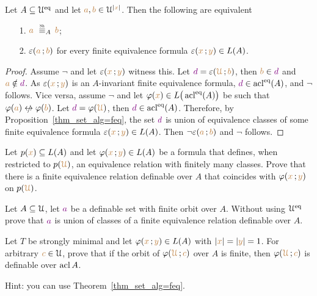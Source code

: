 \documentclass[creche.tex]{subfiles}
\begin{document}
\begin{proposition}
Let $A\subseteq\EuScript U^{{\rm eq}}$ and let ${\color{brown} a},{\color{brown} b}\in\EuScript U^{|{\color{brown} x}|}$. Then the following are equivalent
\begin{itemize}
\item[1.]  ${\mr a}\ \equivSh_A\, {\mr b}$;
\item[2.]  $\varepsilon({\color{brown} a}\,;{\color{brown} b})$ for every finite equivalence formula $\varepsilon({\color{brown} x}\,;{\color{brown} y})\in L(A)$.
\end{itemize} 
\end{proposition}
\begin{proof}
Assume $\neg$ and let $\varepsilon({\color{brown} x}\,;{\color{brown} y})$ witness this. Let ${\color{violet} d}=\varepsilon({\color{brown}\EuScript U}\,;{\color{brown} b})$, then  ${\color{brown} b}\in{\color{violet}d}$ and ${\color{brown} a}\notin{\color{violet}d}$. As $\varepsilon({\color{brown} x}\,;{\color{brown} y})$ is an $A$-invariant finite equivalence formula, ${\color{violet} d}\in\mathop{\rm acl}^{{\rm eq}}(A)$, and $\neg$ follows. Vice versa, assume $\neg$ and let $\varphi({\color{brown} x})\in L\big(\mathop{\rm acl}^{{\rm eq}}(A)\big)$ be  such that $\phi({\mr a})\niff\phi({\mr b})$. Let ${\color{violet} d}=\varphi({\color{brown}\EuScript U})$, then ${\color{violet} d}\in\mathop{\rm acl}^{{\rm eq}}(A)$. Therefore, by Proposition~\ref{thm_set_alg=feq}, the set ${\color{violet} d}$ is union of equivalence classes of some finite equivalence formula $\varepsilon({\color{brown} x}\,;{\color{brown} y})\in L(A)$. Then $\neg\varepsilon({\color{brown} a}\,;{\color{brown} b})$ and $\neg$ follows.
\end{proof}

\begin{exercise}
Let $p({\color{brown} x})\subseteq L(A)$ and let $\varphi({\color{brown} x}\,;{\color{brown} y})\in L(A)$ be a formula that defines, when restricted to $p({\color{brown}\EuScript U})$, an equivalence relation with finitely many classes. Prove that there is a finite equivalence relation definable over $A$ that coincides with $\varphi({\color{brown} x}\,;{\color{brown} y})$ on $p({\color{brown}\EuScript U})$.\QED
\end{exercise}

\begin{exercise}\label{ex_feqthm_senza_eq}
Let $A\subseteq\EuScript U$, let ${\color{violet} a}$ be a definable set with finite orbit over $A$. Without using $\EuScript U^{{\rm eq}}$ prove that ${\color{violet} a}$ is union of classes of a finite equivalence relation definable over $A$.\QED
\end{exercise}

\begin{exercise}
Let $T$ be strongly minimal and let $\varphi({\color{brown} x}\,;{\color{brown} y})\in L(A)$ with $|{\color{brown} x}|=|{\color{brown} y}|=1$. For arbitrary ${\color{brown} c}\in\EuScript U$, prove that if the orbit of $\varphi({\color{brown}\EuScript U}\,; {\color{brown} c})$ over $A$ is finite, then $\varphi({\color{brown}\EuScript U}\,; {\color{brown} c})$ is definable over $\mathop{\rm acl} A$. 

Hint: you can use Theorem~\ref{thm_set_alg=feq}.\QED
\end{exercise}
\end{document}
